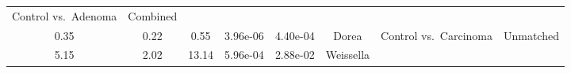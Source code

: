 \documentclass[12pt,]{article}
\begin{document}
\begin{longtable}[]{@{}cccccccc@{}}
\begin{minipage}[t]{0.14\columnwidth}
Control vs.~Adenoma\strut
\end{minipage} & \begin{minipage}[t]{0.09\columnwidth}\centering\strut
Combined\strut
\end{minipage}\tabularnewline
\begin{minipage}[t]{0.05\columnwidth}\centering\strut
0.35\strut
\end{minipage} & \begin{minipage}[t]{0.09\columnwidth}\centering\strut
0.22\strut
\end{minipage} & \begin{minipage}[t]{0.09\columnwidth}\centering\strut
0.55\strut
\end{minipage} & \begin{minipage}[t]{0.07\columnwidth}\centering\strut
3.96e-06\strut
\end{minipage} & \begin{minipage}[t]{0.07\columnwidth}\centering\strut
4.40e-04\strut
\end{minipage} & \begin{minipage}[t]{0.20\columnwidth}\centering\strut
Dorea\strut
\end{minipage} & \begin{minipage}[t]{0.14\columnwidth}\centering\strut
Control vs.~Carcinoma\strut
\end{minipage} & \begin{minipage}[t]{0.09\columnwidth}\centering\strut
Unmatched\strut
\end{minipage}\tabularnewline
\begin{minipage}[t]{0.05\columnwidth}\centering\strut
5.15\strut
\end{minipage} & \begin{minipage}[t]{0.09\columnwidth}\centering\strut
2.02\strut
\end{minipage} & \begin{minipage}[t]{0.09\columnwidth}\centering\strut
13.14\strut
\end{minipage} & \begin{minipage}[t]{0.07\columnwidth}\centering\strut
5.96e-04\strut
\end{minipage} & \begin{minipage}[t]{0.07\columnwidth}\centering\strut
2.88e-02\strut
\end{minipage} & \begin{minipage}[t]{0.20\columnwidth}\centering\strut
Weissella\strut
\end{minipage} & \begin{minipage}[t]{0.14\columnwidth}\centering\strut

\end{minipage}
\end{longtable}
\end{document}
